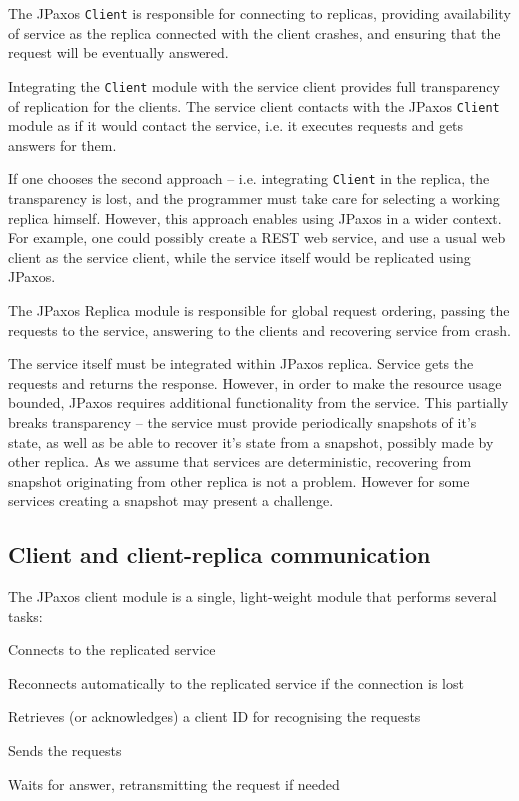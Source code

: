 The JPaxos \texttt{Client} is responsible for connecting to replicas, providing availability of service as the replica connected with the client crashes, and ensuring that the request will be eventually answered.

Integrating the \texttt{Client} module with the service client provides full transparency of replication for the clients.
The service client contacts with the JPaxos \texttt{Client} module as if it would contact the service, i.e. it executes requests and gets answers for them.

If one chooses the second approach -- i.e. integrating \texttt{Client} in the replica, the transparency is lost, and the programmer must take care for selecting a working replica himself. However, this approach enables using JPaxos in a wider context. For example, one could possibly create a REST web service, and use a usual web client as the service client, while the service itself would be replicated using JPaxos.

The JPaxos Replica module is responsible for global request ordering, passing the requests to the service, answering to the clients and recovering service from crash.

The service itself must be integrated within JPaxos replica. Service gets the requests and returns the response. However, in order to make the resource usage bounded, JPaxos requires additional functionality from the service. This partially breaks transparency -- the service must provide periodically snapshots of it's state, as well as be able to recover it's state from a snapshot, possibly made by other replica.
As we assume that services are deterministic, recovering from snapshot originating from other replica is not a problem. However for some services creating a snapshot may present a challenge.

\subsection{Client and client-replica communication}

The JPaxos client module is a single, light-weight module that performs several tasks:

\begin{tightList}[\setlength{\topsep}{0pt} \setlength{\partopsep}{0pt}]
 \item[\textbullet] Connects to the replicated service
 \item[\textbullet] Reconnects automatically to the replicated service if the connection is lost
 \item[\textbullet] Retrieves (or acknowledges) a client ID for recognising the requests
 \item[\textbullet] Sends the requests
 \item[\textbullet] Waits for answer, retransmitting the request if needed
\end{tightList}

